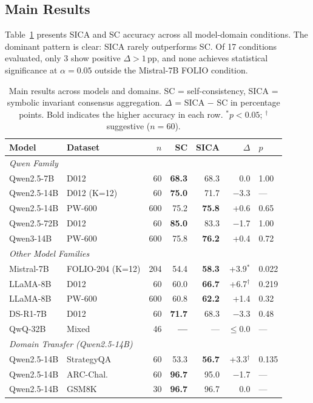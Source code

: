 \documentclass[11pt,a4paper]{article}
\begin{document}
\subsection{Main Results}
\label{sec:main_results}

Table~\ref{tab:main} presents SICA and SC accuracy across all model-domain conditions. The dominant pattern is clear: SICA rarely outperforms SC. Of 17 conditions evaluated, only 3 show positive $\Delta > 1$\,pp, and none achieves statistical significance at $\alpha = 0.05$ outside the Mistral-7B FOLIO condition.

\begin{table}[t]
\centering
\caption{Main results across models and domains. SC = self-consistency, SICA = symbolic invariant consensus aggregation. $\Delta$ = SICA $-$ SC in percentage points. Bold indicates the higher accuracy in each row. $^*p < 0.05$; $^\dagger$ suggestive ($n=60$).}
\label{tab:main}
\small
\begin{tabular}{llrrrrl}
\toprule
\textbf{Model} & \textbf{Dataset} & \textbf{$n$} & \textbf{SC} & \textbf{SICA} & \textbf{$\Delta$} & \textbf{$p$} \\
\midrule
\multicolumn{7}{l}{\textit{Qwen Family}} \\
Qwen2.5-7B  & D012     &  60 & \textbf{68.3} & 68.3 &  0.0 & 1.00 \\
Qwen2.5-14B & D012 (K=12) &  60 & \textbf{75.0} & 71.7 & $-$3.3 & --- \\
Qwen2.5-14B & PW-600   & 600 & 75.2 & \textbf{75.8} & +0.6 & 0.65 \\
Qwen2.5-72B & D012     &  60 & \textbf{85.0} & 83.3 & $-$1.7 & 1.00 \\
Qwen3-14B   & PW-600   & 600 & 75.8 & \textbf{76.2} & +0.4 & 0.72 \\
\midrule
\multicolumn{7}{l}{\textit{Other Model Families}} \\
Mistral-7B  & FOLIO-204 (K=12) & 204 & 54.4 & \textbf{58.3} & +3.9$^*$ & 0.022 \\
LLaMA-8B    & D012     &  60 & 60.0 & \textbf{66.7} & +6.7$^\dagger$ & 0.219 \\
LLaMA-8B    & PW-600   & 600 & 60.8 & \textbf{62.2} & +1.4 & 0.32 \\
DS-R1-7B    & D012     &  60 & \textbf{71.7} & 68.3 & $-$3.3 & 0.48 \\
QwQ-32B     & Mixed    &  46 & \textbf{---} & --- & $\leq$0.0 & --- \\
\midrule
\multicolumn{7}{l}{\textit{Domain Transfer (Qwen2.5-14B)}} \\
Qwen2.5-14B & StrategyQA & 60 & 53.3 & \textbf{56.7} & +3.3$^\dagger$ & 0.135 \\
Qwen2.5-14B & ARC-Chal.  & 60 & \textbf{96.7} & 95.0 & $-$1.7 & --- \\
Qwen2.5-14B & GSM8K      & 30 & \textbf{96.7} & 96.7 &  0.0 & --- \\
\bottomrule
\end{tabular}
\vspace{0.3em}


\end{table}
\end{document}
